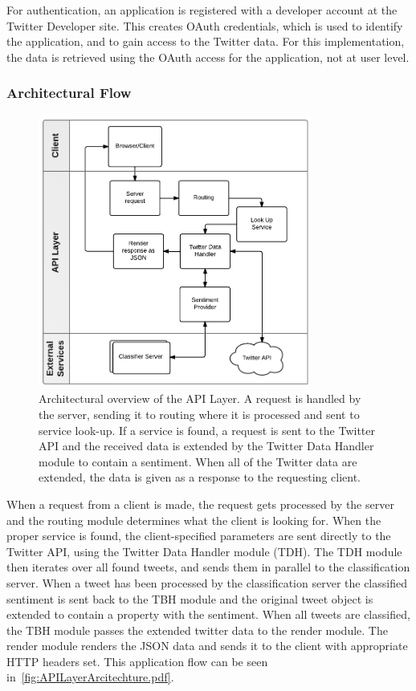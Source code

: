 For authentication, an application is registered with a developer account at the Twitter Developer site. This creates OAuth credentials, which is used to identify the application, and to gain access to the Twitter data. For this implementation, the data is retrieved using the OAuth access for the application, not at user level. 

\subsubsection{Architectural Flow}


\begin{figure}[htb]
 \begin{center}
     \includegraphics[width=0.8\textwidth]{../img/APILayerArcitechture.pdf}
 \end{center}
 \caption[Architectural overview of the API Layer.]{Architectural overview of the API Layer. A request is handled by the server, sending it to routing where it is processed and sent to service look-up. If a service is found, a request is sent to the Twitter API and the received data is extended by the Twitter Data Handler module to contain a sentiment. When all of the Twitter data are extended, the data is given as a response to the requesting client.}
 \label{fig:APILayerArcitechture.pdf}
\end{figure}

When a request from a client is made, the request gets processed by the server and the routing module determines what the client is looking for. When the proper service is found, the client-specified parameters are sent directly to the Twitter API, using the Twitter Data Handler module (TDH). The TDH module then iterates over all found tweets, and sends them in parallel to the classification server. When a tweet has been processed by the classification server the classified sentiment is sent back to the TBH module and the original tweet object is extended to contain a property with the sentiment. When all tweets are classified, the TBH module passes the extended twitter data to the render module. The render module renders the JSON data and sends it to the client with appropriate HTTP headers set. This application flow can be seen in~\autoref{fig:APILayerArcitechture.pdf}.

